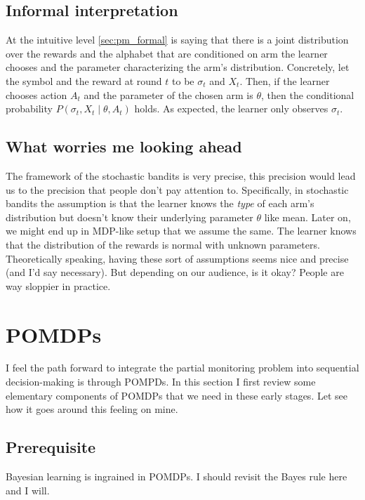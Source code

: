 \documentclass[a4paper]{article}
\theoremstyle{definition}
\begin{document}
\subsection{Informal interpretation}
At the intuitive level \cref{sec:pm_formal} is saying that there is a joint distribution over the rewards and the alphabet that are conditioned on arm the learner chooses and the parameter characterizing the arm's distribution. Concretely, let the symbol and the reward at round $t$ to be $\sigma_t$ and $X_t$. Then, if the learner chooses action $A_t$ and the parameter of the chosen arm is $\theta$, then the conditional probability $P(\sigma_t, X_t \mid \theta, A_t)$ holds. As expected, the learner only observes $\sigma_t$.

\subsection{What worries me looking ahead}
The framework of the stochastic bandits is very precise, this precision would lead us to the precision that people don't pay attention to. Specifically, in stochastic bandits the assumption is that the learner knows the \emph{type} of each arm's distribution but doesn't know their underlying parameter $\theta$ like mean. Later on, we might end up in MDP-like setup that we assume the same. The learner knows that the distribution of the rewards is normal with unknown parameters. Theoretically speaking, having these sort of assumptions seems nice and precise (and I'd say necessary). But depending on our audience, is it okay? People are way sloppier in practice.
%
\section{POMDPs}
I feel the path forward to integrate the partial monitoring problem into sequential decision-making is through POMPDs. In this section I first review some elementary components of POMDPs that we need in these early stages. Let see how it goes around this feeling on mine.
%
\subsection{Prerequisite}
Bayesian learning is ingrained in POMDPs. I should revisit the Bayes rule here and I will.
\end{document}
